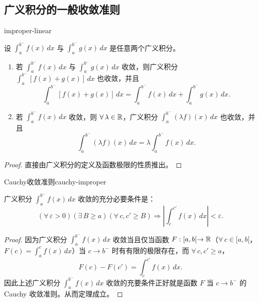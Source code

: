 \subsection{广义积分的一般收敛准则}
	\label{sec:9-2-1}

\begin{mythm}{}{improper-linear}

设 $\displaystyle\int_a^{b^-}f(x)\,dx$ 与 $\displaystyle\int_a^{b^-}g(x)\,dx$ 是任意两个广义积分。

\begin{enumerate}[label=\arabic{enumi})]
\item 若 $\displaystyle\int_a^{b^-}f(x)\,dx$ 与 $\displaystyle\int_a^{b^-}g(x)\,dx$ 收敛，则广义积分 $\displaystyle\int_a^{b^-}[f(x)+g(x)]\,dx$ 也收敛，并且
\[\int_a^{b^-}[f(x)+g(x)]\,dx=\int_a^{b^-}f(x)\,dx+\int_a^{b^-}g(x)\,dx.\]
\item 若 $\displaystyle\int_a^{b^-}f(x)\,dx$ 收敛，则 $\forall\,\lambda\in\mathbb{R}$，广义积分 $\displaystyle\int_a^{b^-}(\lambda f)(x)\,dx$ 也收敛，并且
\[\int_a^{b^-}(\lambda f)(x)\,dx=\lambda\int_a^{b^-}f(x)\,dx.\]
\end{enumerate}

\end{mythm}

\begin{proof}

直接由广义积分的定义及函数极限的性质推出。

\end{proof}

\begin{mythm}{Cauchy收敛准则}{cauchy-improper}

广义积分 $\displaystyle\int_a^{b^-}f(x)\,dx$ 收敛的充分必要条件是：
\[(\forall\,\varepsilon>0)(\exists\,B\geqslant a)(\forall\,c,c'\geqslant B)\Longrightarrow\left|\int_c^{c'}f(x)\,dx\right|<\varepsilon.\]

\end{mythm}

\begin{proof}

因为广义积分 $\displaystyle\int_a^{b^-}f(x)\,dx$ 收敛当且仅当函数 $F:[a,b[\to\mathbb{R}$（$\forall\,c\in[a,b[$，$F(c)=\displaystyle\int_a^cf(x)\,dx$）当 $c\to b^-$ 时有有限的极限存在，而 $\forall\,c,c'\geqslant a$，
\[F(c)-F(c')=\int_c^{c'}f(x)\,dx.\]
因此上述广义积分 $\displaystyle\int_a^{b^-}f(x)\,dx$ 收敛的充要条件正好就是函数 $F$ 当 $c\to b^-$ 的 Cauchy 收敛准则。从而定理成立。

\end{proof}

